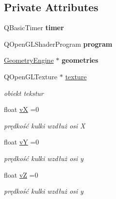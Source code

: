 \subsection*{Private Attributes}
\begin{DoxyCompactItemize}
\item 
\mbox{\label{classMainWidget_ad374794388dcffd3e8717ad0db47f49b}} 
Q\+Basic\+Timer {\bfseries timer}
\item 
\mbox{\label{classMainWidget_a3c27f255c09a836aa755e6047b68c339}} 
Q\+Open\+G\+L\+Shader\+Program {\bfseries program}
\item 
\mbox{\label{classMainWidget_aee734e7e5ac07e82fe4d497dac5b0ac1}} 
\hyperlink{classGeometryEngine}{Geometry\+Engine} $\ast$ {\bfseries geometries}
\item 
\mbox{\label{classMainWidget_acc21b7eeeca01d94b5cd6d7ec079cfe0}} 
Q\+Open\+G\+L\+Texture $\ast$ \hyperlink{classMainWidget_acc21b7eeeca01d94b5cd6d7ec079cfe0}{texture}
\begin{DoxyCompactList}\small\item\em obiekt tekstur \end{DoxyCompactList}\item 
\mbox{\label{classMainWidget_a91986f4cd0a536889c4697eb81fb82c1}} 
float \hyperlink{classMainWidget_a91986f4cd0a536889c4697eb81fb82c1}{vX} =0
\begin{DoxyCompactList}\small\item\em prędkość kulki wzdłuż osi X \end{DoxyCompactList}\item 
\mbox{\label{classMainWidget_abfd21f44f83f520d2b020a36e73d88c1}} 
float \hyperlink{classMainWidget_abfd21f44f83f520d2b020a36e73d88c1}{vY} =0
\begin{DoxyCompactList}\small\item\em prędkość kulki wzdłuż osi y \end{DoxyCompactList}\item 
\mbox{\label{classMainWidget_ac832d7564e43ed2d6e2a03c651a7bf27}} 
float \hyperlink{classMainWidget_ac832d7564e43ed2d6e2a03c651a7bf27}{vZ} =0
\begin{DoxyCompactList}\small\item\em prędkość kulki wzdłuż osi y \end{DoxyCompactList}\item 

\end{DoxyCompactItemize}
